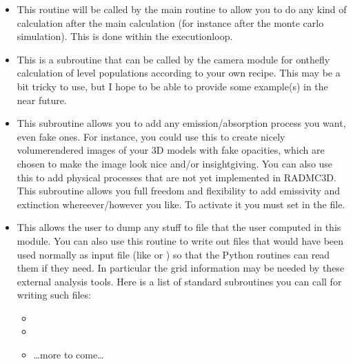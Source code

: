 \documentclass[letterpaper,10pt,english]{sphinxmanual}
\begin{document}
\begin{itemize}
\item {} 

This routine will be called by the main routine to allow you to do any kind of
calculation after the main calculation (for instance after the monte carlo
simulation). This is done within the execution\sphinxhyphen{}loop.

\item {} 

This is a subroutine that can be called by the camera module for
on\sphinxhyphen{}the\sphinxhyphen{}fly calculation of level populations according to your own recipe.
This may be a bit tricky to use, but I hope to be able to provide some
example(s) in the near future.

\item {} 

This subroutine allows you to add any emission/absorption process you
want, even fake ones. For instance, you could use this to create nicely
volume\sphinxhyphen{}rendered images of your 3\sphinxhyphen{}D models with fake opacities, which are
chosen to make the image look nice and/or insight\sphinxhyphen{}giving.  You can also
use this to add physical processes that are not yet implemented in
RADMC\sphinxhyphen{}3D. This subroutine allows you full freedom and flexibility to
add emissivity and extinction whereever/however you like. To activate
it you must set  in the
 file.

\item {} 

This allows the user to dump any stuff to file that the user computed
in this module. You can also use this routine to write out files that would
have been used normally as input file (like  or
) so that the Python routines can read them if
they need. In particular the grid information may be needed by these
external analysis tools. Here is a list of standard subroutines you can
call for writing such files:
\begin{itemize}
\item {} 

\item {} 

\item {} 
…more to come…

\end{itemize}

\end{itemize}
\end{document}

